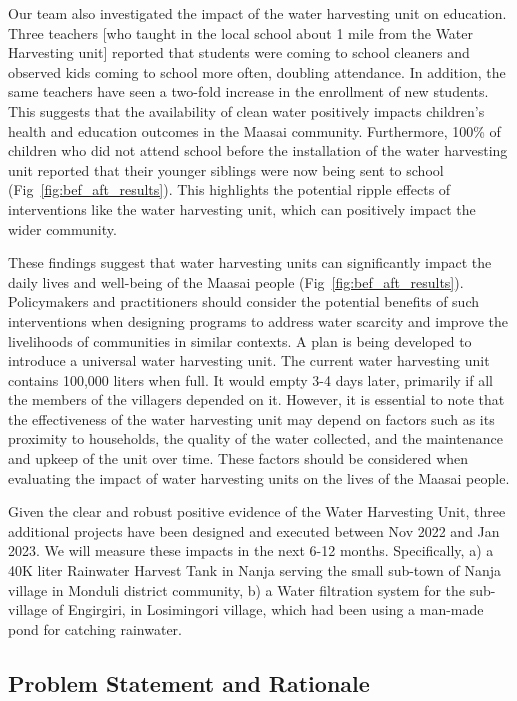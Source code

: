 \documentclass[10pt]{article}
\begin{document}
Our team also investigated the impact of the water harvesting unit on education. Three teachers [who taught in the local school about 1 mile from the Water Harvesting unit] reported that students were coming to school cleaners and observed kids coming to school more often, doubling attendance. In addition, the same teachers have seen a two-fold increase in the enrollment of new students. This suggests that the availability of clean water positively impacts children's health and education outcomes in the Maasai community. Furthermore, 100\% of children who did not attend school before the installation of the water harvesting unit reported that their younger siblings were now being sent to school (Fig~\ref{fig:bef_aft_results}). This highlights the potential ripple effects of interventions like the water harvesting unit, which can positively impact the wider community. 

These findings suggest that water harvesting units can significantly impact the daily lives and well-being of the Maasai people (Fig~\ref{fig:bef_aft_results}). Policymakers and practitioners should consider the potential benefits of such interventions when designing programs to address water scarcity and improve the livelihoods of communities in similar contexts. A plan is being developed to introduce a universal water harvesting unit. The current water harvesting unit contains 100,000 liters when full. It would empty 3-4 days later, primarily if all the members of the villagers depended on it. However, it is essential to note that the effectiveness of the water harvesting unit may depend on factors such as its proximity to households, the quality of the water collected, and the maintenance and upkeep of the unit over time. These factors should be considered when evaluating the impact of water harvesting units on the lives of the Maasai people.

Given the clear and robust positive evidence of the Water Harvesting Unit, three additional projects have been designed and executed between Nov 2022 and Jan 2023. We will measure these impacts in the next 6-12 months. Specifically, a) a 40K liter Rainwater Harvest Tank in Nanja serving the small sub-town of Nanja village in Monduli district community, b) a Water filtration system for the sub-village of Engirgiri, in Losimingori village, which had been using a man-made pond for catching rainwater.

\subsection{Problem Statement and Rationale}
\end{document}

